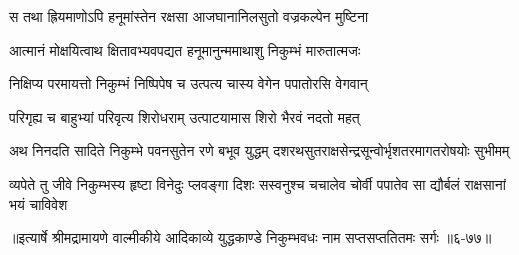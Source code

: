 \twolineshloka
{स तथा ह्रियमाणोऽपि हनूमांस्तेन रक्षसा}
{आजघानानिलसुतो वज्रकल्पेन मुष्टिना} %

\twolineshloka
{आत्मानं मोक्षयित्वाथ क्षितावभ्यवपद्यत}
{हनूमानुन्ममाथाशु निकुम्भं मारुतात्मजः} %

\twolineshloka
{निक्षिप्य परमायत्तो निकुम्भं निष्पिपेष च}
{उत्पत्य चास्य वेगेन पपातोरसि वेगवान्} %

\twolineshloka
{परिगृह्य च बाहुभ्यां परिवृत्य शिरोधराम्}
{उत्पाटयामास शिरो भैरवं नदतो महत्} %

\twolineshloka
{अथ निनदति सादिते निकुम्भे पवनसुतेन रणे बभूव युद्धम्}
{दशरथसुतराक्षसेन्द्रसून्वोर्भृशतरमागतरोषयोः सुभीमम्} %

\twolineshloka
{व्यपेते तु जीवे निकुम्भस्य हृष्टा विनेदुः प्लवङ्गा दिशः सस्वनुश्च}
{चचालेव चोर्वी पपातेव सा द्यौर्बलं राक्षसानां भयं चाविवेश} %


॥इत्यार्षे श्रीमद्रामायणे वाल्मीकीये आदिकाव्ये युद्धकाण्डे निकुम्भवधः नाम सप्तसप्ततितमः सर्गः ॥६-७७॥
